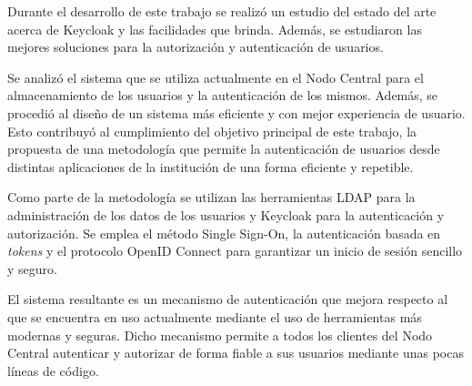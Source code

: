 \begin{conclusions}
    Durante el desarrollo de este trabajo se realizó un estudio del estado del arte acerca de Keycloak y las facilidades que brinda. Además, se estudiaron las mejores soluciones para la autorización y autenticación de usuarios.
    
    Se analizó el sistema que se utiliza actualmente en el Nodo Central para el almacenamiento de los usuarios y la autenticación de los mismos. Además, se procedió al diseño de un sistema más eficiente y con mejor experiencia de usuario. Esto contribuyó al cumplimiento del objetivo principal de este trabajo, la propuesta de una metodología que permite la autenticación de usuarios desde distintas aplicaciones de la institución de una forma eficiente y repetible.
    
    Como parte de la metodología se utilizan las herramientas LDAP para la administración de los datos de los usuarios y Keycloak para la autenticación y autorización. Se emplea el método Single Sign-On, la autenticación basada en \textit{tokens} y el protocolo OpenID Connect para garantizar un inicio de sesión sencillo y seguro.
    
    El sistema resultante es un mecanismo de autenticación que mejora respecto al que se encuentra en uso actualmente mediante el uso de herramientas más modernas y seguras. Dicho mecanismo permite a todos los clientes del Nodo Central autenticar y autorizar de forma fiable a sus usuarios mediante unas pocas líneas de código.
\end{conclusions}
